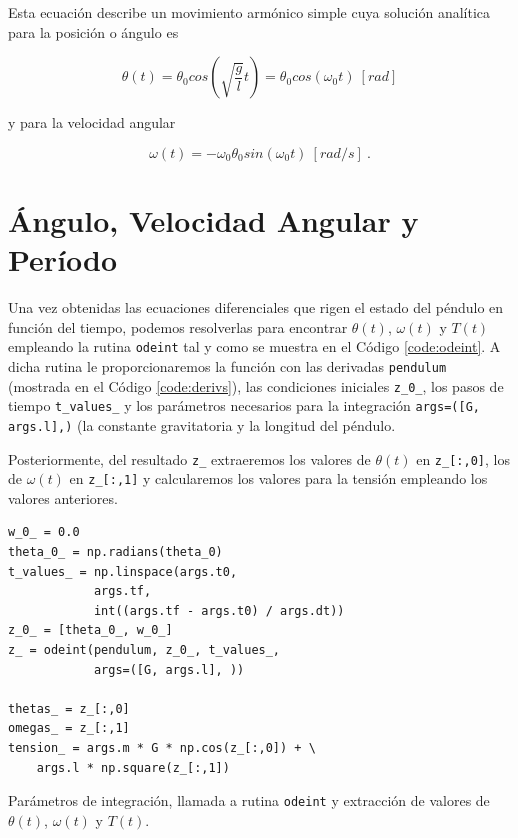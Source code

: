 \documentclass[journal]{IEEEtran}
\newenvironment{code}{\captionsetup{type=listing}}{\par\addvspace{\baselineskip}}
\begin{document}
Esta ecuación describe un movimiento armónico simple cuya solución analítica para la posición o ángulo es

\begin{equation}
  \theta(t) = \theta_0 cos(\sqrt{\displaystyle\frac{g}{l}}t) = \theta_0 cos(\omega_0t) ~[rad]
\end{equation}

y para la velocidad angular

\begin{equation}
  \omega(t) = - \omega_0\theta_0 sin(\omega_0t) ~[rad/s]~.
\end{equation}

\section{Ángulo, Velocidad Angular y Período}

Una vez obtenidas las ecuaciones diferenciales que rigen el estado del péndulo en función del tiempo, podemos resolverlas para encontrar $\theta(t)$, $\omega(t)$ y $T(t)$ empleando la rutina \texttt{odeint} tal y como se muestra en el Código \ref{code:odeint}. A dicha rutina le proporcionaremos la función con las derivadas \texttt{pendulum} (mostrada en el Código \ref{code:derivs}), las condiciones iniciales
\texttt{z_0_}, los pasos de tiempo \texttt{t_values_} y los parámetros necesarios para la integración \texttt{args=([G, args.l],)} (la constante gravitatoria y la longitud del péndulo.

Posteriormente, del resultado \texttt{z_} extraeremos los valores de $\theta(t)$ en \texttt{z_[:,0]}, los de $\omega(t)$ en \texttt{z_[:,1]} y calcularemos los valores para la tensión empleando los valores anteriores.

\medskip

\begin{code}
  \begin{verbatim}
w_0_ = 0.0
theta_0_ = np.radians(theta_0)
t_values_ = np.linspace(args.t0,
            args.tf,
            int((args.tf - args.t0) / args.dt))
z_0_ = [theta_0_, w_0_]
z_ = odeint(pendulum, z_0_, t_values_,
            args=([G, args.l], ))

thetas_ = z_[:,0]
omegas_ = z_[:,1]
tension_ = args.m * G * np.cos(z_[:,0]) + \
    args.l * np.square(z_[:,1])
  \end{verbatim}
  \caption{Parámetros de integración, llamada a rutina \texttt{odeint} y extracción de valores de $\theta(t)$, $\omega(t)$ y $T(t)$.}
  \label{code:odeint}
\end{code}
\end{document}
